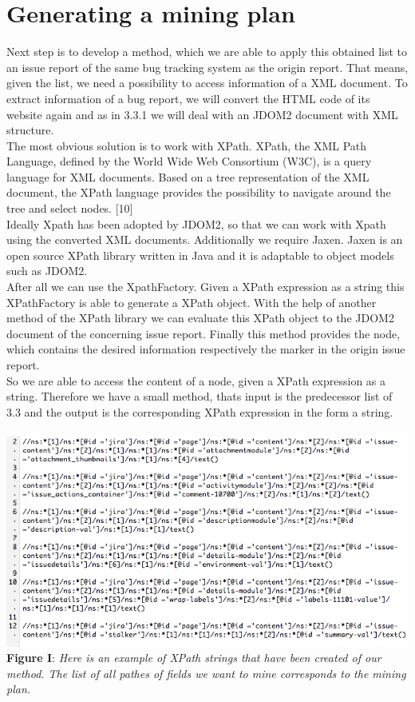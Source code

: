 \section{Generating a mining plan}
\label{Generating a mining plan}
Next step is to develop a method, which we are able to apply this obtained list to an issue report of the same bug tracking system as the origin report. That means, given the list, we need a possibility to access information of a XML document. To extract information of a bug report, we will convert the HTML code of its website again and as in 3.3.1 we will deal with an JDOM2 document with XML structure. \\ The most obvious solution is to work with XPath. XPath, the XML Path Language, defined by the World Wide Web Consortium (W3C), is a query language for XML documents. Based on a tree representation of the XML document, the XPath language provides the possibility to navigate around the tree and select nodes. [10] \\
Ideally Xpath has been adopted by JDOM2, so that we can work with Xpath using the converted XML documents. Additionally we require Jaxen. Jaxen is an open source XPath library written in Java and it is adaptable to object models such as JDOM2. \\ After all we can use the XpathFactory. Given a XPath expression as a string this XPathFactory is able to generate a XPath object. With the help of another method of the XPath library we can evaluate this XPath object to the JDOM2 document of the concerning issue report. Finally this method provides the node, which contains the desired information respectively the marker in the origin issue report. \\ So we are able to access the content of a node, given a XPath expression as a string.
Therefore we have a small method, thats input is the predecessor list of 3.3 and the output is the corresponding XPath expression in the form a string.
\\ \\ \includegraphics[width=1.0\textwidth]{xpath-example.png}  \\\textbf{Figure I}: \textit{Here is an example of XPath strings that have been created of our method. The list of all pathes of fields we want to mine corresponds to the mining plan.} \\ \\
